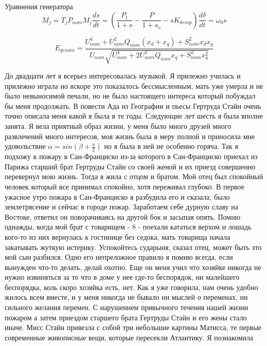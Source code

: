 \documentclass[]{article}
\begin{document}
	
Уравнения генератора
\begin{subequations}
\begin {equation}
M_j = T_j P_{nom}
\end {equation}
\begin {equation}
M_j\frac{ds}{dt} = (\frac{P_t}{1+s} - \frac{P}{1+s_v} - sK_{demp})
\end {equation}
\begin {equation}
\frac{d\delta}{dt} = \omega_0s
\end {equation}
\end{subequations}

\begin{equation}
E_{qenom}=\frac{U^4_{nom}+U^2_{nom}Q_{nom}(x_d+x_q)+S^2_{nom}x_dx_q}{U_{nom}\sqrt{U^4_{nom}+2U^2_{nom}Q_{nom}x_q+S^2_{nom}x^2_q}}
\end{equation}


До  двадцати лет я всерьез интересовалась музыкой. Я прилежно училась и
прилежно играла но вскоре это показалось бессмысленным, мать уже умерла и не
было невыносимой печали, но не было  настоящего интереса который побуждал бы
меня продолжать. В  повести  Ада из Географии и  пьесы Гертруда Стайн  очень
точно описала меня какой я была в те годы.
Следующие лет шесть я была вполне занята. Я  вела приятный образ жизни,
у меня было много друзей много развлечений много интересов, моя жизнь была в
меру полной и приносила мне удовольствие $ \alpha=sin(\beta+\frac{\pi}{2}) $ но я была в ней не особенно горяча.
Так  я  подхожу к пожару  в  Сан-Франциско  из-за  которого  в Сан-Франциско
приехал  из Парижа старший  брат Гертруды Стайн со  своей женой и их  приезд
совершенно перевернул мою жизнь.
Тогда я жила с отцом  и братом. Мой отец был спокойный человек  который
все принимал спокойно, хотя переживал  глубоко. В первое ужасное утро пожара
в Сан-Франциско я  разбудила его и  сказала, было землетрясение  и  сейчас в
городе  пожар.  Заработаем   себе  дурную  славу  на  Востоке,   ответил  он
поворачиваясь на другой бок и засыпая опять. Помню однажды, когда мой брат с
товарищем
- 8 -
поехали кататься верхом и лошадь  кого-то из них вернулась к  гостинице
без седока, мать  товарища  начала  закатывать жуткую  истерику. Успокойтесь
сударыня, сказал отец, может быть это мой сын разбился. Одно его непреложное
правило  я  помню всегда, если вынужден что-то делать, делай охотно.  Еще он
меня учил что хозяйке никогда не нужно  извиняться  за то что в доме  у  нее
где-то беспорядок, ни малейшего беспорядка, коль скоро хозяйка есть, нет.
Как я уже говорила,  нам  очень удобно  жилось всем вместе,  и  у  меня
никогда  не бывало ни  мыслей  о переменах, ни  сильного  желания перемен. С
нарушением привычного  течения нашей жизни пожаром а затем приездом старшего
брата Гертруды Стайн и его жены стало иначе.
Мисс Стайн привезла с собой  три  небольшие картины  Матисса, те первые
современные живописные вещи, которые пересекли  Атлантику. Я познакомила
\end{document}

